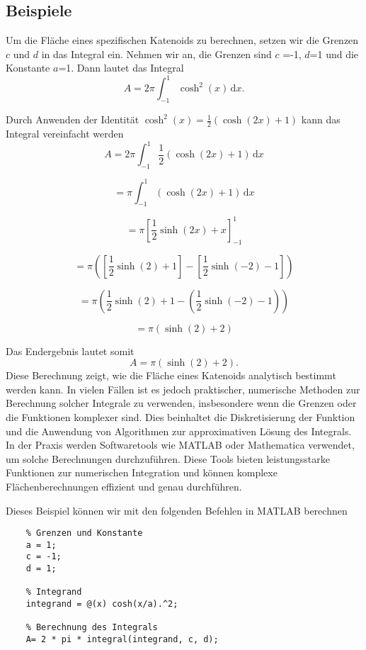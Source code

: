 \subsection{Beispiele
	\label{Das Katenoid:subsection:Beispiele}}
Um die Fläche eines spezifischen Katenoids zu berechnen, setzen wir die Grenzen $c$ und $d$ in das Integral ein.
Nehmen wir an, die Grenzen sind $c$ =-1, $d$=1 und die Konstante $a$=1.
Dann lautet das Integral	
\[
A = 2\pi \int_{-1}^{1} \cosh^2 (x) \, \mathrm{d}x.
\]

Durch Anwenden der Identität \(\cosh^2 (x) = \frac{1}{2} (\cosh (2x) + 1)\) kann das Integral vereinfacht werden
\[
A = 2\pi \int_{-1}^{1} \frac{1}{2} (\cosh (2x) + 1) \, \mathrm{d}x
\]

\[
= \pi \int_{-1}^{1} (\cosh (2x) + 1) \, \mathrm{d}x
\]

\[
= \pi \left[ \frac{1}{2} \sinh (2x) + x \right]_{-1}^{1}
\]

\[
= \pi \left( \left[ \frac{1}{2} \sinh (2) + 1 \right] - \left[ \frac{1}{2} \sinh (-2) - 1 \right] \right)
\]

\[
= \pi \left( \frac{1}{2} \sinh (2) + 1 - \left( \frac{1}{2} \sinh (-2) - 1 \right) \right)
\]

\[
= \pi \left( \sinh (2) + 2 \right)
\]

Das Endergebnis lautet somit
\[
A = \pi (\sinh (2) + 2).
\]
Diese Berechnung zeigt, wie die Fläche eines Katenoids analytisch bestimmt werden kann.
In vielen Fällen ist es jedoch praktischer, numerische Methoden zur Berechnung solcher Integrale zu verwenden, insbesondere wenn die Grenzen oder die Funktionen komplexer sind.
Dies beinhaltet die Diskretisierung der Funktion und die Anwendung von Algorithmen zur approximativen Lösung des Integrals.
In der Praxis werden Softwaretools wie MATLAB oder Mathematica verwendet, um solche Berechnungen durchzuführen.
Diese Tools bieten leistungsstarke Funktionen zur numerischen Integration und können komplexe Flächenberechnungen effizient und genau durchführen.

Dieses Beispiel können wir mit den folgenden Befehlen in MATLAB berechnen

\begin{lstlisting}
	% Grenzen und Konstante
	a = 1;
	c = -1;
	d = 1;
	
	% Integrand
	integrand = @(x) cosh(x/a).^2;
	
	% Berechnung des Integrals
	A= 2 * pi * integral(integrand, c, d);
\end{lstlisting}

